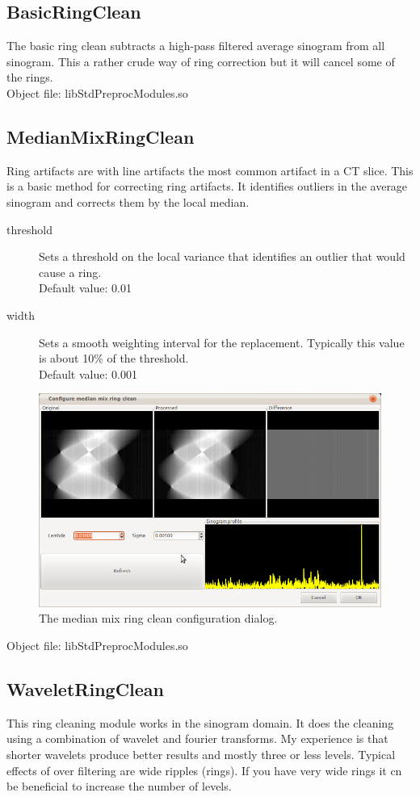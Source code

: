 \documentclass[a4paper]{scrreprt}
\begin{document}
\subsection{BasicRingClean}
The basic ring clean subtracts a high-pass filtered average sinogram from all sinogram. This a rather crude way of ring correction but it will cancel some of the rings.\\
Object file: libStdPreprocModules.so

\subsection{MedianMixRingClean}
Ring artifacts are with line artifacts the most common artifact in a CT slice. This is a basic method for correcting ring artifacts. It identifies outliers in the average sinogram and corrects them by the local median.
\begin{description}
 \item[threshold] Sets a threshold on the local variance that identifies an outlier that would cause a ring. \\ Default value: 0.01
\item[width] Sets a smooth weighting interval for the replacement. Typically this value is about 10\% of the threshold. \\ Default value: 0.001
\end{description}
\begin{figure}[ht!]
\centering
\includegraphics[scale=0.5]{figures/ConfMedMixRing.png}
\caption{The median mix ring clean configuration dialog.}
\end{figure}

Object file: libStdPreprocModules.so

\subsection{WaveletRingClean}
This ring cleaning module works in the sinogram domain. It does the cleaning using a combination of wavelet and fourier transforms\cite{muench2009_stripefilter}. My experience is that shorter wavelets produce better results and mostly three or less levels. Typical effects of over filtering are wide ripples (rings). If you have very wide rings it cn be beneficial to increase the number of levels. 
\end{document}
